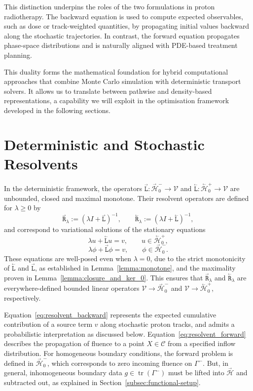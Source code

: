 \documentclass{amsart}
\newcommand{\fL}{\stackrel{_\rightarrow}{\mathtt L}}
\newcommand{\bL}{\stackrel{_\leftarrow}{\mathtt L}}
\newcommand{\fR}{\stackrel{_\rightarrow}{\mathtt R}}
\newcommand{\bR}{\stackrel{_\leftarrow}{\mathtt R}}
\theoremstyle{plain}
\newcommand{\cH}{\stackrel{_\rightarrow}{\mathscr H}}
\newcommand{\cbH}{\stackrel{_\leftarrow}{\mathscr H}}
\newcommand{\cV}{\ensuremath{\mathscr V}}
\begin{document}
This distinction underpins the roles of the two formulations in proton
radiotherapy. The backward equation is used to compute expected
observables, such as dose or track-weighted quantities, by propagating
initial values backward along the stochastic trajectories. In contrast, the
forward equation propagates phase-space distributions and is naturally
aligned with PDE-based treatment planning.

This duality forms the mathematical foundation for hybrid
computational approaches that combine Monte Carlo simulation with
deterministic transport solvers. It allows us to translate between
pathwise and density-based representations, a capability we will
exploit in the optimisation framework developed in the following
sections.

\section{Deterministic and Stochastic Resolvents}
\label{sec:resolvent}

In the deterministic framework, the operators $\fL : \cH_0^- \to \cV$
and $\bL : \cbH_0^+ \to \cV$ are unbounded, closed and maximal
monotone. Their resolvent operators are defined for $\lambda \geq 0$
by
\begin{equation}
  \fR_\lambda := (\lambda I + \fL)^{-1}, \qquad \bR_\lambda := (\lambda I + \bL)^{-1},
\end{equation}
and correspond to variational solutions of the stationary equations
\begin{equation}
  \lambda u + \bL u = v, \qquad u \in \cbH_0^+,
  \label{eq:resolvent_backward}
\end{equation}
\begin{equation}
  \lambda \phi + \fL \phi = v, \qquad \phi \in \cH_0^-.
  \label{eq:resolvent_forward}
\end{equation}
These equations are well-posed even when $\lambda = 0$, due to the
strict monotonicity of $\bL$ and $\fL$, as established in
Lemma~\ref{lemma:monotone}, and the maximality proven in
Lemma~\ref{lemma:closure_and_ker_0}. This ensures that $\fR_\lambda$
and $\bR_\lambda$ are everywhere-defined bounded linear operators $\cV
\to \cH_0^-$ and $\cV \to \cbH_0^+$, respectively.

Equation~\eqref{eq:resolvent_backward} represents the expected
cumulative contribution of a source term $v$ along stochastic proton
tracks, and admits a probabilistic interpretation as discussed
below. Equation~\eqref{eq:resolvent_forward} describes the propagation
of fluence to a point $X \in \mathcal{C}$ from a specified inflow
distribution. For homogeneous boundary conditions, the forward problem
is defined in $\cH_0^-$, which corresponds to zero incoming fluence on
$\Gamma^-$. But, in general, inhomogeneous boundary data $g \in
\operatorname{tr}(\Gamma^-)$ must be lifted into $\cH$ and subtracted
out, as explained in Section~\ref{subsec:functional-setup}.
\end{document}
